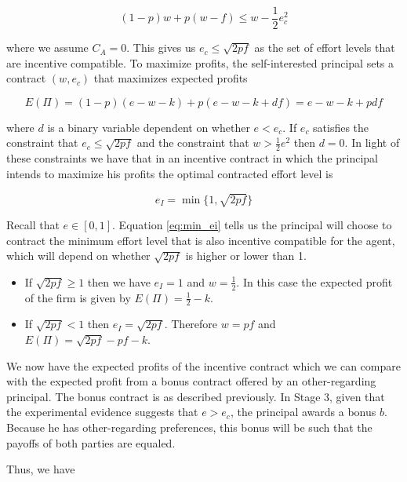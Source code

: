 \documentclass[12pt]{article}
\begin{document}
\begin{equation}
	\left(1-p\right) w + p \left(w-f\right) \leq w - \frac{1}{2}e^2_c
\end{equation}

\noindent
where we assume $C_A = 0$. This gives us $e_c \leq \sqrt{2pf}$ as the set of effort levels that are incentive compatible. To maximize profits, the self-interested principal sets a contract $\left(w,e_c\right)$ that maximizes expected profits

\begin{equation}
	E\left(\Pi\right) = \left(1-p\right)\left(e-w-k\right)+p\left(e-w-k+df\right) = e-w-k+pdf
\end{equation}

\noindent
where $d$ is a binary variable dependent on whether $e<e_c$. If $e_c$ satisfies the constraint that $e_c \leq \sqrt{2pf}$ and the constraint that $w > \frac{1}{2} e^2$ then $d=0$. In light of these constraints we have that in an incentive contract in which the principal intends to maximize his profits the optimal contracted effort level is 

\begin{equation}\label{eq:min_ei}
	e_I = \min\{1,\sqrt{2pf}\}
\end{equation}

Recall that $e \in [0,1]$. Equation \eqref{eq:min_ei} tells us the principal will choose to contract the minimum effort level that is also incentive compatible for the agent, which will depend on whether $\sqrt{2pf}$ is higher or lower than 1.
\begin{itemize}
\item If $\sqrt{2pf} \geq 1$ then we have $e_I = 1$ and $w=\frac{1}{2}$. In this case the expected profit of the firm is given by $E\left(\Pi\right) = \frac{1}{2} - k$.
\item If $\sqrt{2pf} < 1$ then $e_I = \sqrt{2pf}$. Therefore $w=pf$ and $E\left(\Pi\right) = \sqrt{2pf} - pf - k$. 
\end{itemize}
 
We now have the expected profits of the incentive contract which we can compare with the expected profit from a bonus contract offered by an other-regarding principal. The bonus contract is as described previously. In Stage 3, given that the experimental evidence suggests that $e>e_c$, the principal awards a bonus $b$. Because he has other-regarding preferences, this bonus will be such that the payoffs of both parties are equaled. 

Thus, we have
\end{document}
